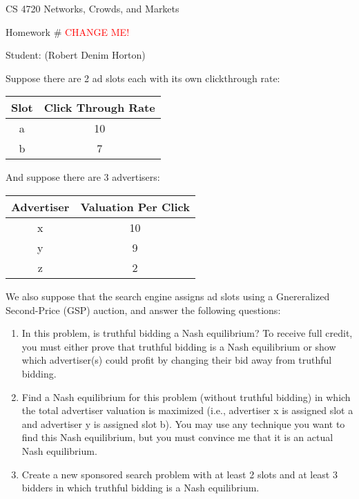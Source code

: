 \documentclass[11pt]{article}
\begin{document}
 

\rhead{\today}

\begin{center}\begin{Large}
CS 4720 Networks, Crowds, and Markets

Homework \#  \textcolor{red}{CHANGE ME!}

Student: (Robert Denim Horton)
\end{Large}
\end{center}

Suppose there are 2 ad slots each with its own clickthrough rate: 
\begin{center}
\begin{tabular}{ |c|c|} 
 \hline
 Slot & Click Through Rate \\ 
 \hline\hline
 a & 10 \\ 
 \hline
 b & 7 \\ 
 \hline
\end{tabular}
\end{center}
And suppose there are 3 advertisers:
\begin{center}
\begin{tabular}{ |c|c| } 
 \hline
 Advertiser & Valuation Per Click \\ 
 \hline\hline
 x & 10 \\
 \hline 
 y & 9 \\
 \hline
z & 2 \\ 
 \hline
\end{tabular}
\end{center}
We also suppose that the search engine assigns ad slots using a Gnereralized Second-Price (GSP) auction, and answer the following questions:
\begin{enumerate}
	 \item In this problem, is truthful bidding a Nash equilibrium? To receive full credit, you must either prove that truthful bidding is a Nash equilibrium or show which advertiser(s) could profit by changing their bid away from truthful bidding.

	\item  Find a Nash equilibrium for this problem (without truthful bidding) in which the total advertiser valuation is maximized (i.e., advertiser x is assigned slot a and advertiser y is assigned slot b). You may use any technique you want to find this Nash equilibrium, but you must convince me that it is an actual Nash equilibrium.
	
	\item Create a new sponsored search problem with at least 2 slots and at least 3 bidders in which truthful bidding is a Nash equilibrium.
\end{enumerate}
\end{document}
